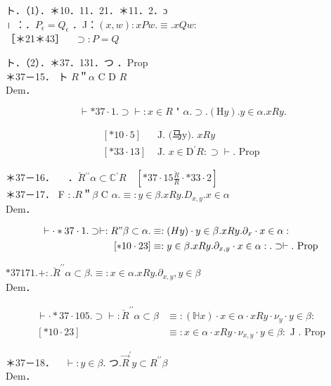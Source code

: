 \documentclass[10pt]{article}
\begin{document}
ト．（1）．＊10．11．21．＊11．2．ɔ\\
। ：．$P_{\epsilon}=Q_{\epsilon}$ ．J：$(x, w): x P w . \equiv . x Q w:$\\
［＊21＊43］$\quad \supset: P=Q$

ト．（2）．＊37．131．つ ．Prop\\
＊37－15． ト $R$＂$\alpha$ C D $R$\\
Dem．

$$
\vdash * 37 \cdot 1 . \supset \vdash: x \in R \text { " } \alpha . \supset .(\mathrm{H} y) . y \in \alpha . x R y .
$$

$$
\begin{array}{ll}
{[* 10 \cdot 5]} & \text { J. (马y). } x R y \\
{[* 33 \cdot 13]} & \text { J. } x \in \mathrm{D}^{\prime} R: \supset \vdash . \text { Prop }
\end{array}
$$

＊37－16．$\quad$ ．$\breve{R}{ }^{\prime \prime} \alpha \subset \mathbb{C}{ }^{\prime} R \quad\left[* 37 \cdot 15 \frac{\breve{R}}{R} \cdot * 33 \cdot 2\right]$\\
＊37－17． F $: . R$＂$\beta$ C $\alpha . \equiv: y \in \beta . x R y . D_{x, y} . x \in \alpha$\\
Dem．

$$
\begin{aligned}
\vdash \cdot * 37 \cdot 1 . \supset \vdash: R " \beta \subset \alpha . & \equiv:(H y) \cdot y \in \beta . x R y . \partial_{x} \cdot x \in \alpha: \\
{[* 10 \cdot 23] } & \equiv: y \in \beta . x R y . \partial_{x, y} \cdot x \in \alpha: . \supset \vdash . \text { Prop }
\end{aligned}
$$

$* 37171 .+: . \breve{R}^{\prime \prime} \alpha \subset \beta . \equiv: x \in \alpha . x R y . \partial_{x, y}, y \in \beta$\\
Dem．

$$
\begin{aligned}
\vdash \cdot * 37 \cdot 105 . \supset \vdash: \breve{R}^{\prime \prime} \alpha \subset \beta & \equiv:(\mathbb{H} x) \cdot x \in \alpha \cdot x R y \cdot \nu_{y} \cdot y \in \beta: \\
{[* 10 \cdot 23] } & \equiv: x \in \alpha \cdot x R y \cdot \nu_{x, y} \cdot y \in \beta: \text { J } . \text { Prop }
\end{aligned}
$$

＊37－18．$\quad \vdash: y \in \beta$. つ.$\vec{R}^{\prime} y \subset R^{\prime \prime} \beta$\\
Dem．
\end{document}
